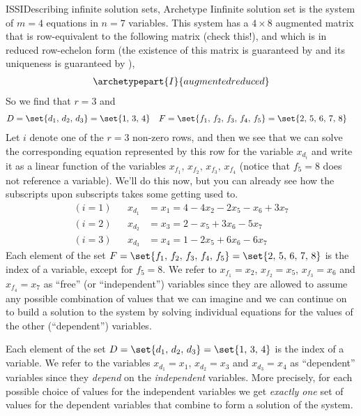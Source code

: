 %
\begin{example}{ISSI}{Describing infinite solution sets, Archetype I}{infinite solution set}
 is the system of $m=4$ equations in $n=7$ variables.
%
%
This system has a $4\times 8$ augmented matrix that is row-equivalent to the following matrix (check this!), and which is in reduced row-echelon form (the existence of this matrix is guaranteed by  and its uniqueness is guaranteed by ),
%
\begin{align*}
\archetypepart{I}{augmentedreduced}
\end{align*}
%
So we find that $r=3$ and
%
\begin{align*}
D&=\set{d_1,\,d_2,\,d_3}=\set{1,\,3,\,4}
&
F&=\set{f_1,\,f_2,\,f_3,\,f_4,\,f_5}=\set{2,\,5,\,6,\,7,\,8}
\end{align*}
Let $i$ denote one of the $r=3$ non-zero rows, and then we see that we can solve the corresponding equation represented by this row for the variable  $x_{d_i}$ and write it as a linear function of the variables $x_{f_1},\,x_{f_2},\,x_{f_3},\,x_{f_4}$ (notice that $f_5=8$ does not reference a variable).  We'll do this now, but you can already see how the subscripts upon subscripts takes some getting used to.
%
\begin{align*}
(i=1)& & x_{d_1}&=x_1=4-4x_2-2x_5-x_6+3x_7\\
(i=2)& & x_{d_2}&=x_3=2-x_5+3x_6-5x_7\\
(i=3)& & x_{d_3}&=x_4=1-2x_5+6x_6-6x_7
\end{align*}
%
Each element of the set $F=\set{f_1,\,f_2,\,f_3,\,f_4,\,f_5}=\set{2,\,5,\,6,\,7,\,8}$ is the index of a variable, except for $f_5=8$.  We refer to $x_{f_1}=x_2$, $x_{f_2}=x_5$, $x_{f_3}=x_6$ and $x_{f_4}=x_7$ as ``free'' (or ``independent'') variables since they are allowed to assume any possible combination of values that we can imagine and we can continue on to build a solution to the system by solving individual equations for the values of the other (``dependent'') variables.\par
%
Each element of the set $D=\set{d_1,\,d_2,\,d_3}=\set{1,\,3,\,4}$ is the index of a variable.  We refer to the variables $x_{d_1}=x_1$, $x_{d_2}=x_3$ and $x_{d_3}=x_4$ as  ``dependent'' variables since they {\em depend} on the {\em independent} variables.  More precisely, for each possible choice of values for the independent variables we get {\em exactly one} set of values for the dependent variables that combine to form a solution of the system.\par

\end{example}
